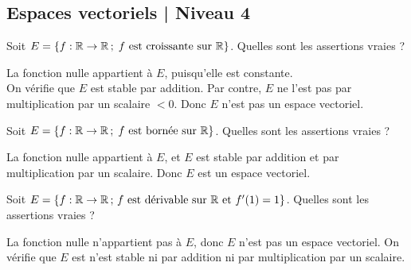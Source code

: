 \subsection{Espaces vectoriels | Niveau 4}

\begin{question}
Soit $E=\{f:\mathbb{R} \to \mathbb{R} \, ; \; f\mbox{ est croissante sur }\mathbb{R}\}$. 
Quelles sont les assertions vraies ?
\begin{answers}  
\end{answers}
\begin{explanations} La fonction nulle appartient à $E$, puisqu'elle est constante.\\
On vérifie que $E$ est stable par addition. Par contre, $E$ ne l'est pas par multiplication par un scalaire $<0$. Donc 
$E$ n'est pas un espace vectoriel.
\end{explanations}
\end{question}

\begin{question}
Soit $E =\{f :\mathbb{R} \to \mathbb{R} \, ; \; f\mbox{ est bornée sur }\mathbb{R}\}$. 
Quelles sont les assertions vraies ?
\begin{answers}  
\end{answers}
\begin{explanations} La fonction nulle appartient à $E$, et $E$ est stable par addition et par multiplication par un scalaire. Donc $E$ est un espace vectoriel.
\end{explanations}
\end{question}

\begin{question}
Soit $E=\{f :\mathbb{R}\to \mathbb{R}\, ;\, f\mbox{ est dérivable sur }\mathbb{R}   \mbox{ et }f'(1)=1\}$. Quelles sont les assertions vraies ?
\begin{answers}
\end{answers}
\begin{explanations} La fonction nulle n'appartient pas à $E$, donc $E$ n'est pas  un espace vectoriel. On vérifie que $E$ est n'est stable ni par addition ni par  multiplication par un scalaire. 
\end{explanations}
\end{question}


